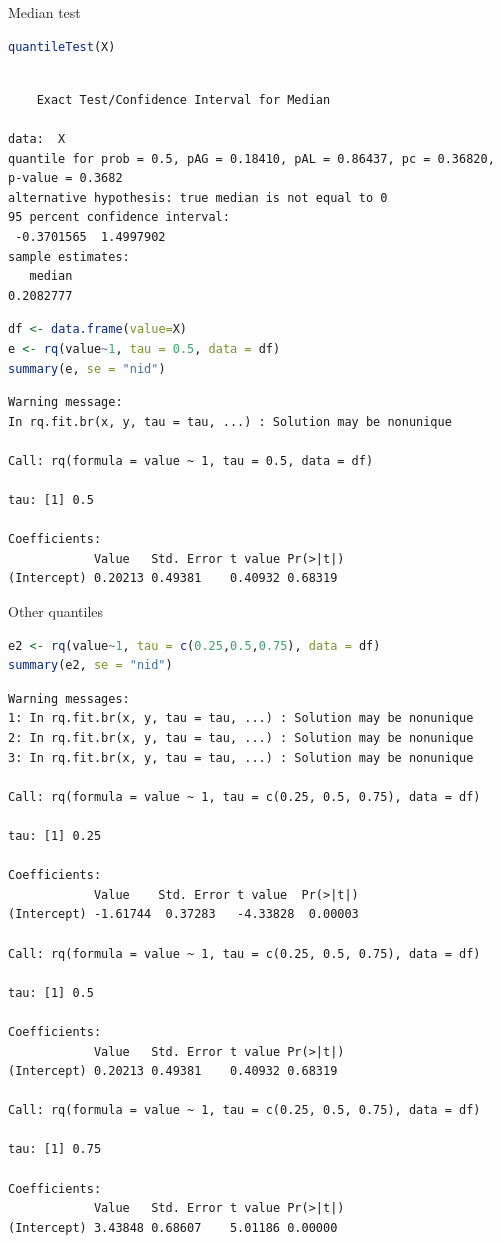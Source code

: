 \documentclass{article}
\begin{document}
Median test
\begin{lstlisting}[language=r,numbers=none]
quantileTest(X)
\end{lstlisting}

\label{}
\begin{verbatim}

	Exact Test/Confidence Interval for Median

data:  X
quantile for prob = 0.5, pAG = 0.18410, pAL = 0.86437, pc = 0.36820, p-value = 0.3682
alternative hypothesis: true median is not equal to 0
95 percent confidence interval:
 -0.3701565  1.4997902
sample estimates:
   median 
0.2082777
\end{verbatim}

\begin{lstlisting}[language=r,numbers=none]
df <- data.frame(value=X)
e <- rq(value~1, tau = 0.5, data = df)
summary(e, se = "nid")
\end{lstlisting}

\label{}
\begin{verbatim}
Warning message:
In rq.fit.br(x, y, tau = tau, ...) : Solution may be nonunique

Call: rq(formula = value ~ 1, tau = 0.5, data = df)

tau: [1] 0.5

Coefficients:
            Value   Std. Error t value Pr(>|t|)
(Intercept) 0.20213 0.49381    0.40932 0.68319
\end{verbatim}

Other quantiles
\begin{lstlisting}[language=r,numbers=none]
e2 <- rq(value~1, tau = c(0.25,0.5,0.75), data = df)
summary(e2, se = "nid")
\end{lstlisting}

\label{}
\begin{verbatim}
Warning messages:
1: In rq.fit.br(x, y, tau = tau, ...) : Solution may be nonunique
2: In rq.fit.br(x, y, tau = tau, ...) : Solution may be nonunique
3: In rq.fit.br(x, y, tau = tau, ...) : Solution may be nonunique

Call: rq(formula = value ~ 1, tau = c(0.25, 0.5, 0.75), data = df)

tau: [1] 0.25

Coefficients:
            Value    Std. Error t value  Pr(>|t|)
(Intercept) -1.61744  0.37283   -4.33828  0.00003

Call: rq(formula = value ~ 1, tau = c(0.25, 0.5, 0.75), data = df)

tau: [1] 0.5

Coefficients:
            Value   Std. Error t value Pr(>|t|)
(Intercept) 0.20213 0.49381    0.40932 0.68319 

Call: rq(formula = value ~ 1, tau = c(0.25, 0.5, 0.75), data = df)

tau: [1] 0.75

Coefficients:
            Value   Std. Error t value Pr(>|t|)
(Intercept) 3.43848 0.68607    5.01186 0.00000
\end{verbatim}
\end{document}
